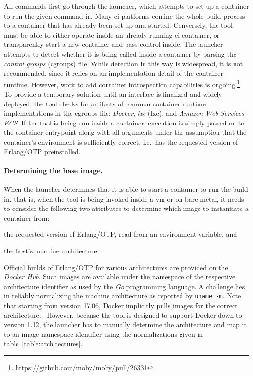 All commands first go through the launcher, which attempts to set up a container to run the given command in. Many \acrshort{ci} platforms confine the whole build process to a container that has already been set up and started. Conversely, the tool must be able to either operate inside an already running \acrshort{ci} container, or transparently start a new container and pass control inside. The launcher attempts to detect whether it is being called inside a container by parsing the \emph{control groups} (cgroups) file. While detection in this way is widespread, it is not recommended, since it relies on an implementation detail of the container runtime. However, work to add container introspection capabilities is ongoing.\footnote{\url{https://github.com/moby/moby/pull/26331}} To provide a temporary solution until an interface is finalized and widely deployed, the tool checks for artifacts of common container runtime implementations in the cgroups file: \emph{Docker}, \emph{\acrlong{lxc}} (\acrshort{lxc}), and \emph{Amazon Web Services ECS}. If the tool is being run inside a container, execution is simply passed on to the container entrypoint along with all arguments under the assumption that the container's environment is sufficiently correct, i.e.~has the requested version of Erlang/OTP preinstalled.

\paragraph{Determining the base image.} When the launcher determines that it is able to start a container to run the build in, that is, when the tool is being invoked inside a \acrshort{vm} or on bare metal, it needs to consider the following two attributes to determine which image to instantiate a container from:
\begin{enumerate*}[label=(\roman*)]
  \item the requested version of Erlang/OTP, read from an environment variable, and
  \item the host's machine architecture.
\end{enumerate*}

Official builds of Erlang/OTP for various architectures are provided on the \emph{Docker Hub}. Such images are available under the namespace of the respective architecture identifier as used by the \emph{Go} programming language. A challenge lies in reliably normalizing the machine architecture as reported by \lstinline|uname -m|. Note that starting from version 17.06, Docker implicitly pulls images for the correct architecture.~\cite{docker:docs} However, because the tool is designed to support Docker down to version 1.12, the launcher has to manually determine the architecture and map it to an image namespace identifier using the normalizations given in table~\ref{table:architectures}.

